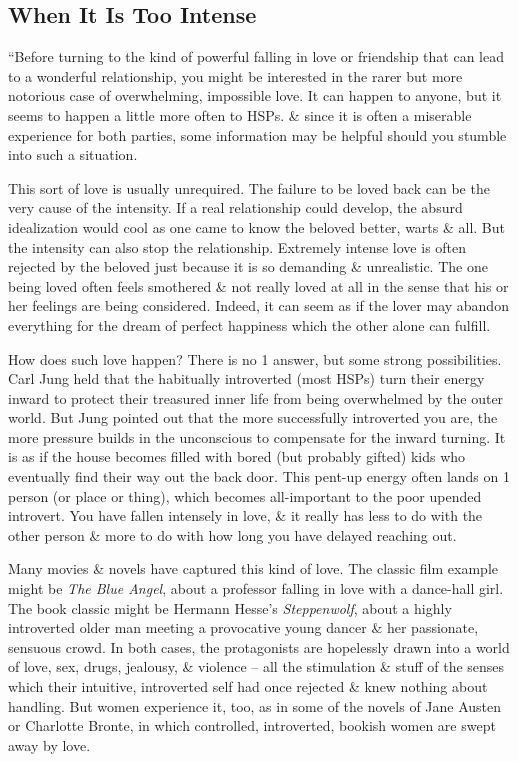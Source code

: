 \documentclass{article}
\numberwithin{equation}{section}
\begin{document}
\subsection{When It Is Too Intense}
``Before turning to the kind of powerful falling in love or friendship that can lead to a wonderful relationship, you might be interested in the rarer but more notorious case of overwhelming, impossible love. It can happen to anyone, but it seems to happen a little more often to HSPs. \& since it is often a miserable experience for both parties, some information may be helpful should you stumble into such a situation.

This sort of love is usually unrequired. The failure to be loved back can be the very cause of the intensity. If a real relationship could develop, the absurd idealization would cool as one came to know the beloved better, warts \& all. But the intensity can also stop the relationship. Extremely intense love is often rejected by the beloved just because it is so demanding \& unrealistic. The one being loved often feels smothered \& not really loved at all in the sense that his or her feelings are being considered. Indeed, it can seem as if the lover may abandon everything for the dream of perfect happiness which the other alone can fulfill.

How does such love happen? There is no 1 answer, but some strong possibilities. Carl Jung held that the habitually introverted (most HSPs) turn their energy inward to protect their treasured inner life from being overwhelmed by the outer world. But Jung pointed out that the more successfully introverted you are, the more pressure builds in the unconscious to compensate for the inward turning. It is as if the house becomes filled with bored (but probably gifted) kids who eventually find their way out the back door. This pent-up energy often lands on 1 person (or place or thing), which becomes all-important to the poor upended introvert. You have fallen intensely in love, \& it really has less to do with the other person \& more to do with how long you have delayed reaching out.

Many movies \& novels have captured this kind of love. The classic film example might be \textit{The Blue Angel}, about a professor falling in love with a dance-hall girl. The book classic might be Hermann Hesse's \textit{Steppenwolf}, about a highly introverted older man meeting a provocative young dancer \& her passionate, sensuous crowd. In both cases, the protagonists are hopelessly drawn into a world of love, sex, drugs, jealousy, \& violence -- all the stimulation \& stuff of the senses which their intuitive, introverted self had once rejected \& knew nothing about handling. But women experience it, too, as in some of the novels of Jane Austen or Charlotte Bronte, in which controlled, introverted, bookish women are swept away by love.
\end{document}
